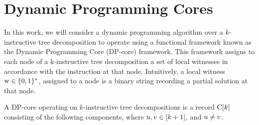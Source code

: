 

  


\section{Dynamic Programming Cores}\label{DPcores}

In this work, we will consider a dynamic programming algorithm over a $k$-instructive tree decomposition to operate using a functional framework known as the Dynamic Programming Core (DP-core) \cite{Baste2022,From2023} framework. 
This framework assigns to each node of a k-instructive tree decomposition a set of local witnesses in accordance with the instruction at that node. Intuitively, a local witness $\mathrm{w} \in \{0,1\}^*$, assigned to a node is a binary string recording a partial solution at that node.

A DP-core operating on $k$-instructive tree decompositions is a record $\mathrm{C}[k]$ consisting of the following components, where $u,v \in [k+1]$, and 
$u\neq v$. 


